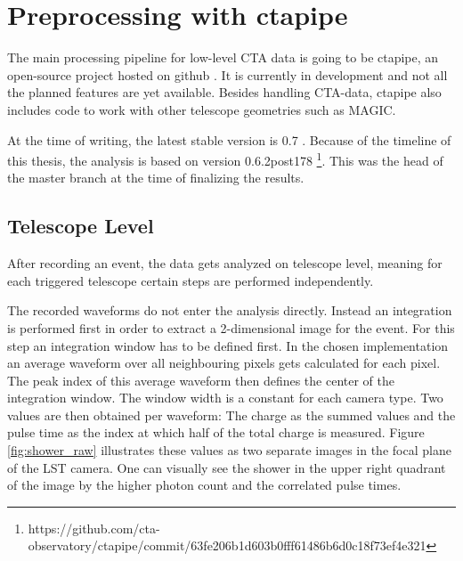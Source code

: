 


\section{Preprocessing with ctapipe}
The main processing pipeline for low-level CTA data is going to be ctapipe,
an open-source project hosted on github \cite{karl_kosack_2019_3372211}.
It is currently in development and not all the planned 
features are yet available.
Besides handling CTA-data, ctapipe also includes code to work with
other telescope geometries such as MAGIC.

At the time of writing, the latest stable version is 0.7
\cite{karl_kosack_2019_3372211}.
Because of the timeline of this thesis, the analysis is based
on version 0.6.2post178 \footnote{https://github.com/cta-observatory/ctapipe/commit/63fe206b1d603b0fff61486b6d0c18f73ef4e321}. 
This was the head of the master branch at the time
of finalizing the results.


\subsection{Telescope Level}
After recording an event, the data gets analyzed on telescope level,
meaning for each triggered telescope certain steps are performed
independently.

The recorded waveforms do not enter the analysis directly. Instead
an integration is performed first in order to extract a 2-dimensional
image for the event.
For this step an integration window has to be defined first.
In the chosen implementation an average waveform over all
neighbouring pixels gets calculated for each pixel.
The peak index of this average waveform then defines the center of the integration window.
The window width is a constant for each camera type.
Two values are then obtained per waveform:
The charge as the summed values and the pulse time as the index at which half
of the total charge is measured.
Figure \ref{fig:shower_raw} illustrates these values as two separate images in
the focal plane of the LST camera.
One can visually see the shower in the upper right quadrant of the
image by the higher photon count and the correlated pulse times.

